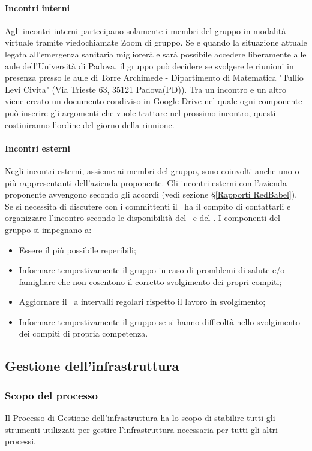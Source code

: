 \paragraph*{Incontri interni}
Agli incontri interni partecipano solamente i membri del gruppo in modalità virtuale tramite viedochiamate Zoom di gruppo.
Se e quando la situazione attuale legata all'emergenza sanitaria migliorerà e sarà possibile accedere liberamente alle aule dell'Università di Padova, il gruppo può decidere se svolgere le riunioni in presenza presso le aule di Torre Archimede - Dipartimento di Matematica "Tullio Levi Civita" (Via Trieste 63, 35121 Padova(PD)).
Tra un incontro e un altro viene creato un documento condiviso in Google Drive nel quale ogni componente può inserire gli argomenti che vuole trattare nel prossimo incontro, questi costiuiranno l'ordine del giorno della riunione.
\paragraph*{Incontri esterni}
Negli incontri esterni, assieme ai membri del gruppo, sono coinvolti anche uno o più rappresentanti dell'azienda proponente.
Gli incontri esterni con l'azienda proponente avvengono secondo gli accordi (vedi sezione \S\ref{Rapporti RedBabel}). Se si necessita di discutere con i committenti il \Responsabile\ ha il compito di contattarli e organizzare l'incontro secondo le disponibilità del \VT\ e del \CR.
\label{NormeGenerali}
I componenti del gruppo si impegnano a:
\begin{itemize}
	\item Essere il più possibile reperibili;
	\item Informare tempestivamente il gruppo in caso di promblemi di salute e/o famigliare che non cosentono il corretto svolgimento dei propri compiti;
	\item Aggiornare il \Responsabile\ a intervalli regolari rispetto il lavoro in svolgimento;
	\item Informare tempestivamente il gruppo se si hanno difficoltà nello svolgimento dei compiti di propria competenza.
\end{itemize}

\subsection{Gestione dell'infrastruttura}
\subsubsection{Scopo del processo}\label{PO_GestioneInfrastruttura_Scopo}
Il Processo di Gestione dell'infrastruttura ha lo scopo di stabilire tutti gli strumenti utilizzati per gestire l'infrastruttura necessaria per tutti gli altri processi.
